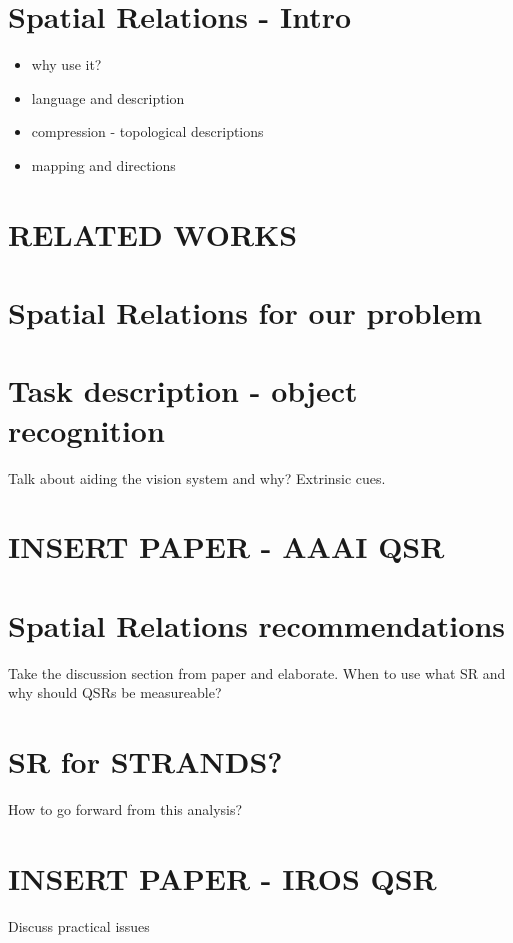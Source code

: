 \section{Spatial Relations - Intro}
\begin{itemize}
\item why use it?
\item language and description
\item compression - topological descriptions
\item mapping and directions
\end{itemize}
\section{RELATED WORKS}
\section{Spatial Relations for our problem}
\section{Task description - object recognition}
Talk about aiding the vision system and why? Extrinsic cues.
\section{INSERT PAPER - AAAI QSR}
\section{Spatial Relations recommendations}
Take the discussion section from paper and elaborate. When to use what SR and why should QSRs be measureable?
\section{SR for STRANDS?}
How to go forward from this analysis?
\section{INSERT PAPER - IROS QSR}
Discuss practical issues
